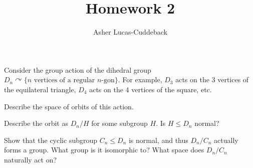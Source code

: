 \documentclass[11pt]{article}
\title{Homework 2}
\author{Asher Lucas-Cuddeback}
\begin{document}
\maketitle
\setcounter{problemcounter}{8}

\begin{problem}
  Consider the group action of the dihedral group
  $D_n \curvearrowright \{n \text{ vertices of a regular } n\text{-gon}\}$.
  For example, $D_3$ acts on the 3 vertices of the equilateral triangle,
  $D_4$ acts on the 4 vertices of the square, etc.
  \begin{parts}

  \item Describe the space of orbits of this action.
    \begin{solution}

    \end{solution}

  \item Describe the orbit as $D_n/H$ for some subgroup $H$. Is $H \le D_n$
    normal?
    \begin{solution}

    \end{solution}

  \item Show that the cyclic subgroup $C_n \le D_n$ is normal, and thus
    $D_n/C_n$ actually forms a group. What group is it isomorphic to? What
    space does $D_n/C_n$ naturally act on?
    \begin{solution}

    \end{solution}

  \end{parts}
\end{problem}
\newpage
\end{document}

